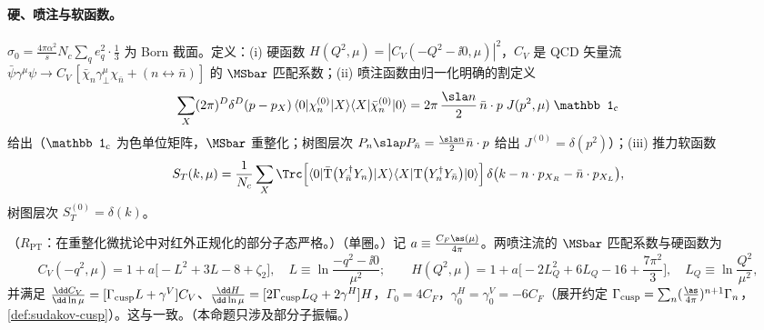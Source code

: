 \paragraph{硬、喷注与软函数。}
$\sigma_0=\frac{4\pi\alpha^2}{s}N_c\sum_qe_q^2\cdot\frac13$ 为 Born 截面。定义：(i) 硬函数 $H(Q^2,\mu)=|C_V(-Q^2-\ii0,\mu)|^2$，$C_V$ 是 QCD 矢量流 $\bar\psi\gamma^\mu\psi\to C_V\,[\bar\chi_n\gamma_\perp^\mu\chi_{\bar n}+(n\leftrightarrow\bar n)]$ 的 $\MSbar$ 匹配系数；(ii) 喷注函数由归一化明确的割定义
\begin{equation}\label{eq:scet-Jdef}
\sum_X(2\pi)^D\delta^D(p-p_X)\,\langle0|\chi^{(0)}_n|X\rangle\langle X|\bar\chi^{(0)}_n|0\rangle=2\pi\,\frac{\sla n}{2}\,\bar n\cdot p\;J(p^2,\mu)\;\mathbb 1_{\rm c}
\end{equation}
给出（$\mathbb 1_{\rm c}$ 为色单位矩阵，$\MSbar$ 重整化；树图层次 $P_n\sla pP_{\bar n}=\frac{\sla n}2\bar n\cdot p$ 给出 $J^{(0)}=\delta(p^2)$）；(iii) 推力软函数
\begin{equation}\label{eq:scet-Sdef}
S_T(k,\mu)=\frac{1}{N_c}\sum_{X}\Trc\Big[\langle0|\bar{\mathrm T}\big(Y_{\bar n}^\dagger Y_n\big)|X\rangle\langle X|\mathrm T\big(Y_n^\dagger Y_{\bar n}\big)|0\rangle\Big]\,
\delta\big(k-n\cdot p_{X_R}-\bar n\cdot p_{X_L}\big),
\end{equation}
树图层次 $S_T^{(0)}=\delta(k)$。

\begin{proposition}\label{prop:scet-hard-matching}
（$R_{\mathrm{PT}}$：在重整化微扰论中对红外正规化的部分子态严格。）（单圈。）记 $a\equiv\frac{C_F\as(\mu)}{4\pi}$。两喷注流的 $\MSbar$ 匹配系数与硬函数为
\begin{equation}\label{eq:scet-CV}
C_V(-q^2,\mu)=1+a\big[-L^2+3L-8+\zeta_2\big],\quad L\equiv\ln\frac{-q^2-\ii0}{\mu^2};\qquad
H(Q^2,\mu)=1+a\Big[-2L_Q^2+6L_Q-16+\frac{7\pi^2}{3}\Big],\quad L_Q\equiv\ln\frac{Q^2}{\mu^2},
\end{equation}
并满足 $\frac{\dd C_V}{\dd\ln\mu}=[\Gamma_{\rm cusp}L+\gamma^V]C_V$、$\frac{\dd H}{\dd\ln\mu}=[2\Gamma_{\rm cusp}L_Q+2\gamma^H]H$，$\Gamma_0=4C_F$，$\gamma^H_0=\gamma^V_0=-6C_F$（展开约定 $\Gamma_{\rm cusp}=\sum_n(\frac{\as}{4\pi})^{n+1}\Gamma_n$，\cref{def:sudakov-cusp}）。这与\cite[附录~B]{BecherSchwartz2008}一致。（本命题只涉及部分子振幅。）
\end{proposition}

